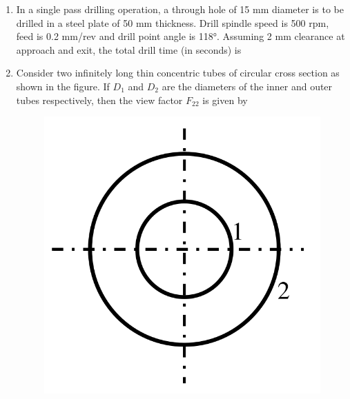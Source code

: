 \documentclass[journal,11pt,onecolumn]{IEEEtran}
\begin{document}
\begin{enumerate}[resume]
    \item In a single pass drilling operation, a through hole of 15 mm diameter is to be drilled in a steel plate of 50 mm thickness. Drill spindle speed is 500 rpm, feed is 0.2 mm/rev and drill point angle is 118°. Assuming 2 mm clearance at approach and exit, the total drill time (in seconds) is

          \begin{enumerate}
          \end{enumerate}

    \item Consider two infinitely long thin concentric tubes of circular cross section as shown in the figure. If \(D_1\) and \(D_2\) are the diameters of the inner and outer tubes respectively, then the view factor \(F_{22}\) is given by
          \begin{figure}[H]
              \centering
              \includegraphics[scale=0.2]{q29}
              \caption{}
              \label{q29}
          \end{figure}


\end{enumerate}
\end{document}
